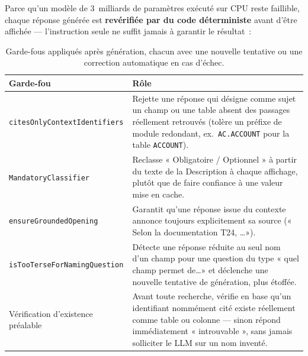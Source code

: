 ﻿\documentclass[12pt,a4paper]{report}
\newcommand{\code}[1]{\texttt{\color{biatbluedk}#1}}
\begin{document}
Parce qu'un modèle de 3~milliards de paramètres exécuté sur CPU reste faillible, chaque réponse générée est \textbf{revérifiée par du code déterministe} avant d'être affichée --- l'instruction seule ne suffit jamais à garantir le résultat~:

\begin{table}[h]
\centering
\small
\caption{Garde-fous appliqués après génération, chacun avec une nouvelle tentative ou une correction automatique en cas d'échec.}
\begin{tabular}{@{}p{4.2cm}p{8.4cm}@{}}
\toprule
\textbf{Garde-fou} & \textbf{Rôle} \\
\midrule
\code{citesOnlyContextIdentifiers} & Rejette une réponse qui désigne comme sujet un champ ou une table absent des passages réellement retrouvés (tolère un préfixe de module redondant, ex.\ \code{AC.ACCOUNT} pour la table \code{ACCOUNT}). \\
\code{MandatoryClassifier} & Reclasse « Obligatoire / Optionnel » à partir du texte de la Description à chaque affichage, plutôt que de faire confiance à une valeur mise en cache. \\
\code{ensureGroundedOpening} & Garantit qu'une réponse issue du contexte annonce toujours explicitement sa source (« Selon la documentation T24, \dots »). \\
\code{isTooTerseForNamingQuestion} & Détecte une réponse réduite au seul nom d'un champ pour une question du type « quel champ permet de\dots » et déclenche une nouvelle tentative de génération, plus étoffée. \\
Vérification d'existence préalable & Avant toute recherche, vérifie en base qu'un identifiant nommément cité existe réellement comme table ou colonne --- sinon répond immédiatement « introuvable », sans jamais solliciter le LLM sur un nom inventé. \\
\bottomrule
\end{tabular}
\end{table}
\end{document}
